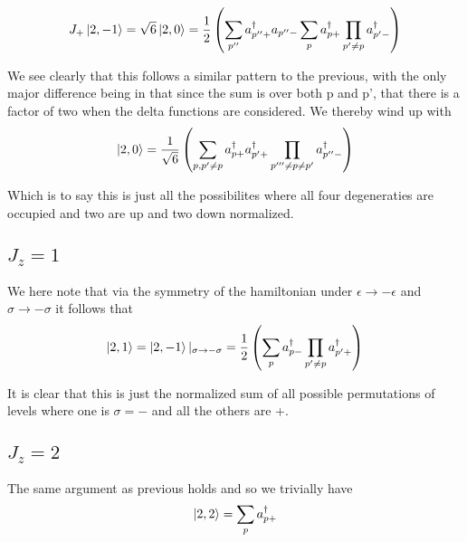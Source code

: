\documentclass[11pt]{article} %
\begin{document}
\begin{equation}
J_+ \ket{2,-1}=\sqrt{6} \ket{2,0}=\frac{1}{2} \left(\sum_{p''} a_{p''+}^\dagger a_{p'' -} \sum_p a_{p+}^\dagger \prod_{p' \neq p} a_{p'-}^\dagger\right)
\end{equation}

We see clearly that this follows a similar pattern to the previous, with the only major difference being in that since the sum is over both p and p', that there is a factor of two when the delta functions are considered. We thereby wind up with\\

\begin{equation}
\ket{2,0}=\frac{1}{\sqrt{6}}\left(\sum_{p,p'\neq p} a_{p+}^\dagger a_{p'+}^\dagger \prod_{p'''\neq p\neq p'} a_{p''-}^\dagger \right)
\end{equation}

Which is to say this is just all the possibilites where all four degeneraties are occupied and two are up and two down normalized.\\

\subsection{$J_z=1$}

We here note that via the symmetry of the hamiltonian under $\epsilon \rightarrow -\epsilon$ and $\sigma \rightarrow -\sigma$ it follows that\\

\begin{equation} \ket{2, 1} =\ket{2,-1} |_{\sigma \rightarrow -\sigma}=\frac{1}{2} \left(\sum_p a_{p-}^\dagger \prod_{p' \neq p} a_{p'+}^\dagger\right)\end{equation}


It is clear that this is just the normalized sum of all possible permutations of levels where one is $\sigma=-$ and all the others are +.

\subsection{$J_z=2$}

The same argument as previous holds and so we trivially have\\

\begin{equation}
\ket{2,2}=\sum_p a_{p+}^\dagger
\end{equation}
\end{document}

